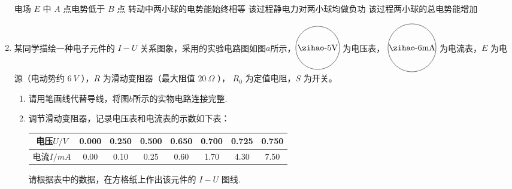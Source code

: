 \begin{enumerate}
\fourchoices
{电场 $ E $ 中 $ A $ 点电势低于 $ B $ 点}
{转动中两小球的电势能始终相等}
{该过程静电力对两小球均做负功}
{该过程两小球的总电势能增加}







\gaokaosy

\item
某同学描绘一种电子元件的 $ I-U $ 关系图象，采用的实验电路图如图$ a $所示，$ \voltmetermytikz $ 为电压表， 
$ \mammetermytikz $ 为电流表，$ E $ 为电源（电动势约 $ 6 \ V $ ），$ R $ 为滑动变阻器（最大阻值 $ 20 \ \Omega $ ）， $ R_{0} $ 为定值电阻，$ S $ 为开关。

\begin{enumerate}
\item
请用笔画线代替导线，将图$ b $所示的实物电路连接完整.
\begin{figure}[h!]
\centering
\begin{subfigure}{0.4\linewidth}
\centering
 
\caption{}\label{}
\end{subfigure}
\begin{subfigure}{0.4\linewidth}
\centering
 
\caption{}\label{}
\end{subfigure}

\end{figure}

\newpage

\item 
调节滑动变阻器，记录电压表和电流表的示数如下表：

\begin{table}[h!]
\centering 
\begin{tabular}{|c|c|c|c|c|c|c|c|}
\hline 
电压$ U/V $ & 0.000 & 0.250 & 0.500 & 0.650 & 0.700 & 0.725 & 0.750
\\
\hline
电流$ I/mA $ & 0.00 & 0.10 & 0.25 & 0.60 & 1.70 & 4.30 & 7.50\\ 
\hline 
\end{tabular}
\end{table} 




请根据表中的数据，在方格纸上作出该元件的 $ I-U $ 图线.

\begin{figure}[h!]
\centering
{}
\end{figure}
\end{enumerate}
\end{enumerate}
